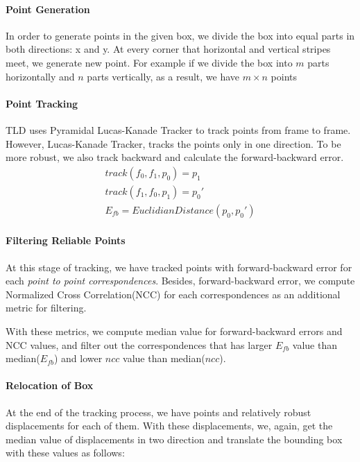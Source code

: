 \documentclass{report}
\begin{document}
        \paragraph{Point Generation}
            In order to generate points in the given box, we divide the box into equal
            parts in both directions: x and y. At every corner that horizontal and vertical stripes meet, we generate
            new point. For example if we divide the box into $m$ parts horizontally and $n$ parts vertically, as a result,
            we have $m \times n$ points
        \paragraph{Point Tracking}
            TLD uses Pyramidal Lucas-Kanade Tracker to track points from frame
            to frame. However, Lucas-Kanade Tracker, tracks the points only in one direction. To be more robust,
            we also track backward and calculate the forward-backward error.
            \begin{gather}
                track(f_{0}, f_{1}, p_{0}) = p_{1} \\
                track(f_{1}, f_{0}, p_{1}) = p_{0}' \\
                E_{fb} = EuclidianDistance(p_{0}, p_{0}')
            \end{gather}
        \paragraph{Filtering Reliable Points}
            At this stage of tracking, we have tracked points with forward-backward error
            for each \textit{point to point correspondences}. Besides, forward-backward error, we compute
            Normalized Cross Correlation(NCC) for each correspondences as an additional metric for filtering.

            With these metrics, we compute median value for forward-backward errors and NCC values, and filter out
            the correspondences that has larger $E_{fb}$ value than median($E_{fb}$) and
            lower $ncc$ value than median($ncc$).

        \paragraph{Relocation of Box}
            At the end of the tracking process, we have points and relatively robust displacements for each of them.
            With these displacements, we, again, get the median value of displacements in two direction and translate
            the bounding box with these values as follows:
\end{document}
